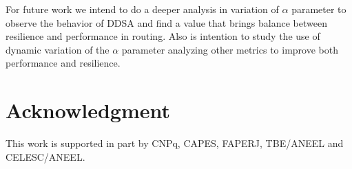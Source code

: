 \documentclass[conference]{IEEEtran}
\begin{document}
For future work we intend to do a deeper analysis in variation of $\alpha$ parameter to observe the behavior of DDSA and find a value that brings balance between resilience and performance in routing. 
Also is intention to study the use of dynamic variation of the $\alpha$ parameter  analyzing other metrics to improve both performance and resilience.



%



\section*{Acknowledgment}


This work is supported in part by CNPq, CAPES, FAPERJ, TBE/ANEEL and CELESC/ANEEL.


\ifCLASSOPTIONcaptionsoff
  \newpage
\fi



\end{document}
